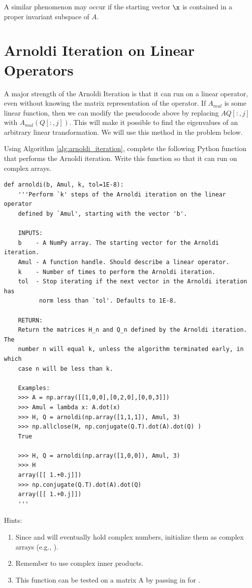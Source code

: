 A similar phenomenon may occur if the starting vector $\x$ is contained in a proper invariant subspace of $A$.

\section*{Arnoldi Iteration on Linear Operators} %

A major strength of the Arnoldi Iteration is that it can run on a linear operator, even without knowing the matrix representation of the operator. If $A_{mul}$ is some linear function, then we can modify the pseudocode above by replacing $AQ[:,j]$ with $A_{mul}(Q[:,j])$. This will make it possible to find the eigenvalues of an arbitrary linear transformation. We will use this method in the problem below.

\begin{problem}\label{prob:arnoldi}
Using Algorithm \ref{alg:arnoldi_iteration}, complete the following Python function that performs the Arnoldi iteration.
Write this function so that it can run on complex arrays.

\begin{lstlisting}
def arnoldi(b, Amul, k, tol=1E-8):
    '''Perform `k' steps of the Arnoldi iteration on the linear operator
    defined by `Amul', starting with the vector 'b'.

    INPUTS:
    b    - A NumPy array. The starting vector for the Arnoldi iteration.
    Amul - A function handle. Should describe a linear operator.
    k    - Number of times to perform the Arnoldi iteration.
    tol  - Stop iterating if the next vector in the Arnoldi iteration has
          norm less than `tol'. Defaults to 1E-8.

    RETURN:
    Return the matrices H_n and Q_n defined by the Arnoldi iteration. The
    number n will equal k, unless the algorithm terminated early, in which
    case n will be less than k.

    Examples:
    >>> A = np.array([[1,0,0],[0,2,0],[0,0,3]])
    >>> Amul = lambda x: A.dot(x)
    >>> H, Q = arnoldi(np.array([1,1,1]), Amul, 3)
    >>> np.allclose(H, np.conjugate(Q.T).dot(A).dot(Q) )
    True

    >>> H, Q = arnoldi(np.array([1,0,0]), Amul, 3)
    >>> H
    array([[ 1.+0.j]])
    >>> np.conjugate(Q.T).dot(A).dot(Q)
    array([[ 1.+0.j]])
    '''
\end{lstlisting}

Hints:
\begin{enumerate}
\item Since  and  will eventually hold complex numbers, initialize them as complex arrays (e.g., ).
\item Remember to use complex inner products.
\item This function can be tested on a matrix A by passing in  for .
\end{enumerate}
\end{problem}

